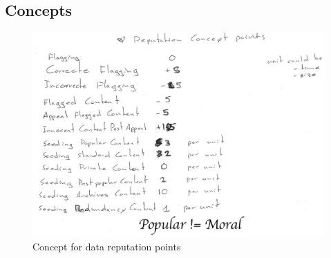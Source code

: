 
\subsection{Concepts}

\begin{figure}[htpb]
\centering
\begin{adjustbox}{center}
\includegraphics[scale=0.7]{annexes/concepts/oc-concept-data-reputation-points.png}
\end{adjustbox}
\caption{Concept for data reputation points
\label{fig:oc-concept-data-reputation-points}}  
\end{figure}

